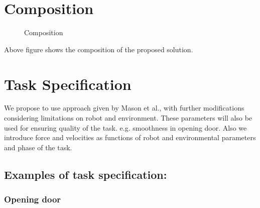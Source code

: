 \documentclass[thesis]{mas_proposal}
\begin{document}
\section{Composition}

\begin{figure}[H]
	\caption{\label{fig:composition} Composition}
\end{figure}
Above figure shows the composition of the proposed solution.

\section{Task Specification}
We propose to use approach given by Mason et al.\cite{mason1981compliance}, with further modifications considering limitations on robot and environment. These parameters will also be used for ensuring quality of the task. e.g. smoothness in opening door. Also we introduce force and velocities as functions of robot and environmental parameters and phase of the task. 

\subsection{Examples of task specification:} 
\subsubsection{Opening door}
\end{document}
